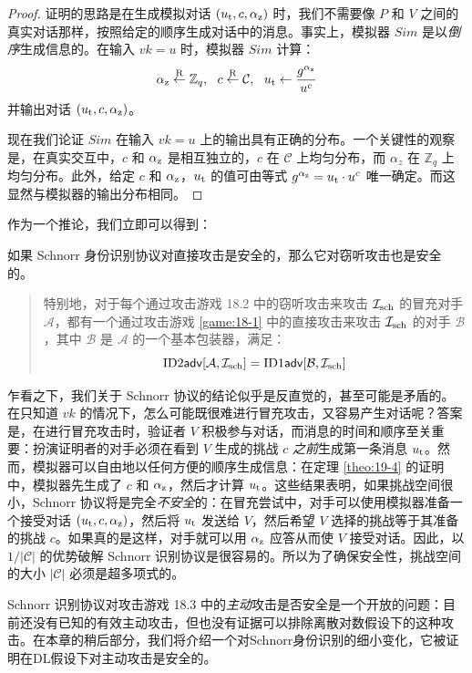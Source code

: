 \begin{proof}
	证明的思路是在生成模拟对话 $(u_{\rm t},c,\alpha_{\rm z})$ 时，我们不需要像 $P$ 和 $V$ 之间的真实对话那样，按照给定的顺序生成对话中的消息。事实上，模拟器 ${Sim}$ 是以\emph{倒序}生成信息的。在输入 $vk=u$ 时，模拟器 ${Sim}$ 计算：
		$$\alpha_{\rm z}\overset{\rm R}\leftarrow\mathbb{Z}_q,~~
		c\overset{\rm R}\leftarrow\mathcal{C},~~
		u_{\rm t}\leftarrow\frac{g^{\alpha_{\rm z}}}{u^c}$$
	并输出对话 $(u_{\rm t},c,\alpha_{\rm z})$。
	
	现在我们论证 ${Sim}$ 在输入 $vk=u$ 上的输出具有正确的分布。一个关键性的观察是，在真实交互中，$c$ 和 $\alpha_{\rm z}$ 是相互独立的，$c$ 在 $\mathcal{C}$ 上均匀分布，而 $\alpha_z$ 在 $\mathbb{Z}_q$ 上均匀分布。此外，给定 $c$ 和 $\alpha_{\rm z}$，$u_{\rm t}$ 的值可由等式 $g^{\alpha_{\rm z}}=u_{\rm t}\cdot u^c$ 唯一确定。而这显然与模拟器的输出分布相同。
\end{proof}

作为一个推论，我们立即可以得到：

\begin{theorem}\label{theo:19-5}
	如果 Schnorr 身份识别协议对直接攻击是安全的，那么它对窃听攻击也是安全的。
	
	\begin{quote}
		特别地，对于每个通过攻击游戏 18.2 中的窃听攻击来攻击 $\mathcal{I}_{\rm sch}$ 的冒充对手 $\mathcal{A}$，都有一个通过攻击游戏 \ref{game:18-1} 中的直接攻击来攻击 $\mathcal{I}_{\rm sch}$ 的对手 $\mathcal{B}$，其中 $\mathcal{B}$ 是 $\mathcal{A}$ 的一个基本包装器，满足：
		$${\rm ID2\mathsf{adv}}[\mathcal{A},\mathcal{I}_{\rm sch}]=
		{\rm ID1\mathsf{adv}}[\mathcal{B},\mathcal{I}_{\rm sch}]$$
	\end{quote}
\end{theorem}

乍看之下，我们关于 Schnorr 协议的结论似乎是反直觉的，甚至可能是矛盾的。在只知道 $vk$ 的情况下，怎么可能既很难进行冒充攻击，又容易产生对话呢？答案是，在进行冒充攻击时，验证者 $V$ 积极参与对话，而消息的时间和顺序至关重要：扮演证明者的对手必须在看到 $V$ 生成的挑战 $c$ \emph{之前}生成第一条消息 $u_{\rm t}$。然而，模拟器可以自由地以任何方便的顺序生成信息：在定理 \ref{theo:19-4} 的证明中，模拟器先生成了 $c$ 和 $\alpha_{\rm z}$，然后才计算 $u_{\rm t}$。这些结果表明，如果挑战空间很小，Schnorr 协议将是完全\emph{不安全}的：在冒充尝试中，对手可以使用模拟器准备一个接受对话 $(u_{\rm t},c,\alpha_{\rm z})$，然后将 $u_{\rm t}$ 发送给 $V$，然后希望 $V$ 选择的挑战等于其准备的挑战 $c$。如果真的是这样，对手就可以用 $\alpha_{\rm z}$ 应答从而使 $V$ 接受对话。因此，以 ${1}/{|\mathcal{C}|}$ 的优势破解 Schnorr 识别协议是很容易的。所以为了确保安全性，挑战空间的大小 $|\mathcal{C}|$ 必须是超多项式的。

Schnorr 识别协议对攻击游戏 18.3 中的\emph{主动}攻击是否安全是一个开放的问题：目前还没有已知的有效主动攻击，但也没有证据可以排除离散对数假设下的这种攻击。在本章的稍后部分，我们将介绍一个对Schnorr身份识别的细小变化，它被证明在DL假设下对主动攻击是安全的。